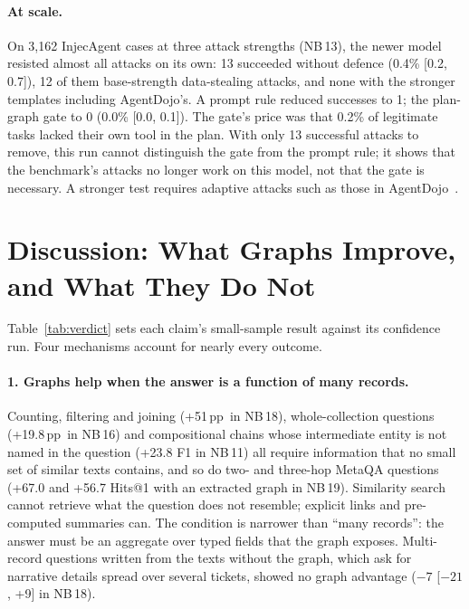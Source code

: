\documentclass[11pt,a4paper]{article}
\newcommand{\pp}{\,pp}
\newcommand{\nb}[1]{NB\,#1}
\begin{document}
\paragraph{At scale.} On 3{,}162 InjecAgent cases at three attack strengths (\nb{13}), the newer model resisted
almost all attacks on its own: 13 succeeded without defence (0.4\% [0.2, 0.7]), 12 of them base-strength
data-stealing attacks, and none with the stronger templates including AgentDojo's. A prompt rule reduced
successes to 1; the plan-graph gate to 0 (0.0\% [0.0, 0.1]). The gate's price was that 0.2\% of legitimate tasks
lacked their own tool in the plan. With only 13 successful attacks to remove, this run cannot distinguish the gate
from the prompt rule; it shows that the benchmark's attacks no longer work on this model, not that the gate is
necessary. A stronger test requires adaptive attacks such as those in AgentDojo~\cite{debenedetti2024agentdojo}.

\section{Discussion: What Graphs Improve, and What They Do Not}
\label{sec:discussion}

Table~\ref{tab:verdict} sets each claim's small-sample result against its confidence run. Four mechanisms account
for nearly every outcome.

\paragraph{1. Graphs help when the answer is a function of many records.} Counting, filtering and joining
(+51\pp\ in \nb{18}), whole-collection questions (+19.8\pp\ in \nb{16}) and compositional chains whose
intermediate entity is not named in the question (+23.8 F1 in \nb{11}) all require information that no small set
of similar texts contains, and so do two- and three-hop MetaQA questions (+67.0 and +56.7 Hits@1 with an
extracted graph in \nb{19}). Similarity search cannot retrieve what the question does not resemble; explicit links
and pre-computed summaries can. The condition is narrower than ``many records'': the answer must be an aggregate
over typed fields that the graph exposes. Multi-record questions written from the texts without the graph, which
ask for narrative details spread over several tickets, showed no graph advantage ($-7$ [$-21$, +9] in \nb{18}).
\end{document}
